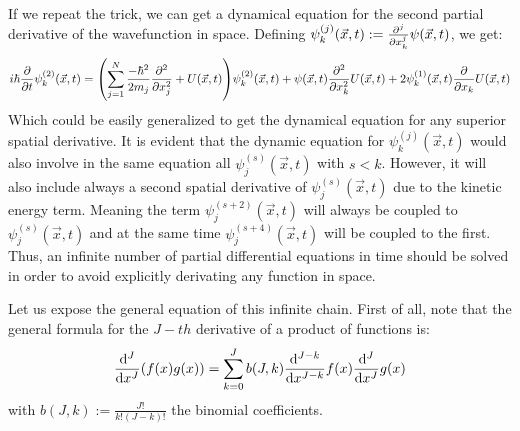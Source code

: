 \documentclass[11pt, a4paper]{article} %
\begin{document}
If we repeat the trick, we can get a dynamical equation for the second partial derivative of the wavefunction in space.
Defining $\psi^{(j)}_k(\vec{x},t):=\pdv[j]{}{x_k}\psi(\vec{x},t)$, we get:\vspace{-0.1cm}
\begin{equation}
i\hbar \pdv{}{t}\psi^{(2)}_k(\vec{x},t) = \qty(\sum_{j=1}^N\frac{-\hbar^2}{2m_j}\pdv[2]{}{x_j}+U(\vec{x},t))\psi^{(2)}_k(\vec{x},t)+ \psi(\vec{x},t)\pdv[2]{}{x_k}U(\vec{x},t)+2\psi^{(1)}_k(\vec{x},t)\pdv{}{x_k}U(\vec{x},t)
\end{equation}
Which could be easily generalized to get the dynamical equation for any superior spatial derivative. It is evident that the dynamic equation for $\psi^{(j)}_k(\vec{x},t)$ would also involve in the same equation all $\psi^{(s)}_j(\vec{x},t)$ with $s<k$. However, it will also include always a second spatial derivative of $\psi^{(s)}_j(\vec{x},t)$ due to the kinetic energy term. Meaning the term $\psi^{(s+2)}_j(\vec{x},t)$ will always be coupled to $\psi^{(s)}_j(\vec{x},t)$ and at the same time $\psi^{(s+4)}_j(\vec{x},t)$ will be coupled to the first. Thus, an infinite number of partial differential equations in time should be solved in order to avoid explicitly derivating any function in space. 

Let us expose the general equation of this infinite chain. First of all, note that the general formula for the $J-th$ derivative of a product of functions is:\vspace{-0.2cm}
\begin{equation}
\dv[J]{}{x}\qty(f(x)g(x))=\sum_{k=0}^J b(J, k)\dv[J-k]{}{x}f(x)\dv[J]{}{x}g(x)\vspace{-0.1cm}
\end{equation}
with $b(J,k):=\frac{J!}{k!(J-k)!}$ the binomial coefficients.
\end{document}
